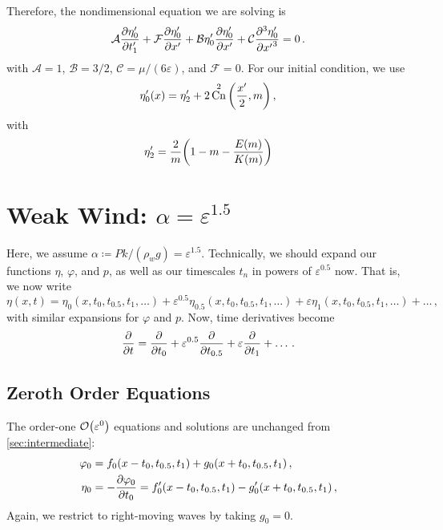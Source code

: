 \documentclass{jfm}
\let\Oldsection\section
\renewcommand{\section}{\FloatBarrier\Oldsection}
\let\Oldsubsection\subsection
\renewcommand{\subsection}{\FloatBarrier\Oldsubsection}
\DeclareMathOperator{\cn}{Cn}
\renewcommand*{\epsilon}{\varepsilon}
\begin{document}
Therefore, the nondimensional equation we are solving is
\begin{equation}
  \mathcal{A} \pdv{\eta'_0}{t'_1} + \mathcal{F} \pdv{\eta'_0}{x'} + \mathcal{B}
  \eta'_0 \pdv{\eta'_0}{x'} + \mathcal{C} \pdv[3]{\eta'_0}{{x'}} = 0 \,.
\end{equation}
with $\mathcal{A} = 1$, $\mathcal{B} = 3/2$, $\mathcal{C} =
\mu/(6\epsilon)$, and $\mathcal{F} = 0$.
For our initial condition, we use
\begin{equation}
  \eta'_0(x) = \eta'_2 + 2 \cn^2\pqty{\frac{x'}{2} , m} \,,
\end{equation}
with
\begin{equation}
  \eta'_2 = \frac{2}{m} \pqty{1 - m - \frac{E(m)}{K(m)}}
\end{equation}

\section{\texorpdfstring{Weak Wind: $\alpha = \epsilon^{1.5}$}{Weak
Wind} \label{sec:weak}}
Here, we assume $\alpha \coloneqq P k/(\rho_w g) = \epsilon^{1.5}$.
Technically, we should expand our functions $\eta$, $\varphi$, and $p$,
as well as our timescales $t_n$ in powers of $\epsilon^{0.5}$ now.
That is, we now write
\begin{equation}
  \eta(x,t) = \eta_0(x,t_0,t_{0.5},t_1,\ldots) + \epsilon^{0.5}
  \eta_{0.5}(x,t_0,t_{0.5},t_1,\ldots) + \epsilon
  \eta_1(x,t_0,t_{0.5},t_1,\ldots) + \ldots \,,
\end{equation}
with similar expansions for $\varphi$ and $p$.
Now, time derivatives become
\begin{equation}
  \pdv{t} = \pdv{t_0} + \epsilon^{0.5} \pdv{t_{0.5}} + \epsilon
  \pdv{t_1} + \ldots \,.
\end{equation}

\subsection{Zeroth Order Equations}
The order-one $\order{\epsilon^0}$ equations and solutions are unchanged
from \cref{sec:intermediate}:
\begin{align}
  \varphi_0 &= f_0(x-t_0,t_{0.5},t_1) + g_0(x+t_0,t_{0.5},t_1) \,, \\
  \eta_0 &= - \pdv{\varphi_0}{t_0} = f_0'(x-t_0,t_{0.5},t_1) -
    g_0'(x+t_0,t_{0.5},t_1) \,,
\end{align}
Again, we restrict to right-moving waves by taking $g_0=0$.
\end{document}
